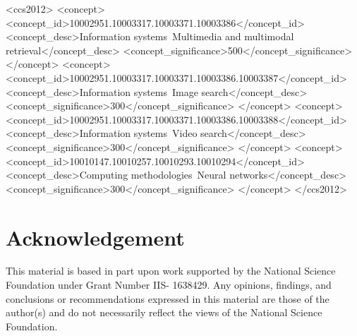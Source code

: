 \documentclass[sigconf]{acmart}
\begin{document}
\begin{CCSXML}
<ccs2012>
<concept>
<concept_id>10002951.10003317.10003371.10003386</concept_id>
<concept_desc>Information systems~Multimedia and multimodal retrieval</concept_desc>
<concept_significance>500</concept_significance>
</concept>
<concept>
<concept_id>10002951.10003317.10003371.10003386.10003387</concept_id>
<concept_desc>Information systems~Image search</concept_desc>
<concept_significance>300</concept_significance>
</concept>
<concept>
<concept_id>10002951.10003317.10003371.10003386.10003388</concept_id>
<concept_desc>Information systems~Video search</concept_desc>
<concept_significance>300</concept_significance>
</concept>
<concept>
<concept_id>10010147.10010257.10010293.10010294</concept_id>
<concept_desc>Computing methodologies~Neural networks</concept_desc>
<concept_significance>300</concept_significance>
</concept>
</ccs2012>
\end{CCSXML}



\maketitle








\section{Acknowledgement}
This material is based in part upon work supported by the National Science Foundation under Grant Number IIS- 1638429. Any opinions, findings, and conclusions or recommendations expressed in this material are those of the author(s) and do not necessarily reflect the views of the National Science Foundation.


 
\end{document}
